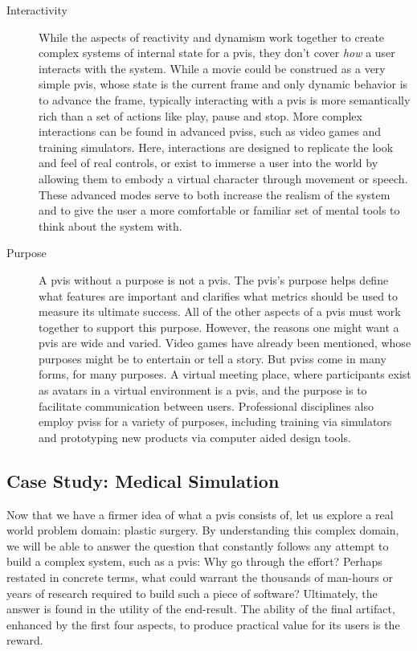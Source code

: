 \begin{description}
\item[Interactivity] While the aspects of reactivity and dynamism work
  together to create complex systems of internal state for a
  \gls{pvis}, they don't cover \textit{how} a user interacts with the
  system. While a movie could be construed as a very simple
  \gls{pvis}, whose state is the current frame and only dynamic
  behavior is to advance the frame, typically interacting with a
  \gls{pvis} is more semantically rich than a set of actions like
  play, pause and stop. More complex interactions can be found in
  advanced \glspl{pvis}, such as video games and training
  simulators. Here, interactions are designed to replicate the look
  and feel of real controls, or exist to immerse a user into the world
  by allowing them to embody a virtual character through movement or
  speech. These advanced modes serve to both increase the realism of
  the system and to give the user a more comfortable or familiar set
  of mental tools to think about the system with.

\item[Purpose] A \gls{pvis} without a purpose is not a \gls{pvis}. The
  \gls{pvis}'s purpose helps define what features are important and
  clarifies what metrics should be used to measure its ultimate
  success. All of the other aspects of a \gls{pvis} must work together
  to support this purpose.  However, the reasons one might want a
  \gls{pvis} are wide and varied. Video games have already been
  mentioned, whose purposes might be to entertain or tell a story. But
  \glspl{pvis} come in many forms, for many purposes. A virtual
  meeting place, where participants exist as avatars in a virtual
  environment is a \gls{pvis}, and the purpose is to facilitate
  communication between users. Professional disciplines also employ
  \glspl{pvis} for a variety of purposes, including training via
  simulators and prototyping new products via computer aided design
  tools.
      
\end{description}

\subsection{Case Study: Medical Simulation}

Now that we have a firmer idea of what a \acrlong{pvis} consists of,
let us explore a real world problem domain: plastic surgery. By
understanding this complex domain, we will be able to answer the
question that constantly follows any attempt to build a complex
system, such as a \gls{pvis}: Why go through the effort?  Perhaps
restated in concrete terms, what could warrant the thousands of
man-hours or years of research required to build such a piece of
software? Ultimately, the answer is found in the utility of the
end-result. The ability of the final artifact, enhanced by the first
four aspects, to produce practical value for its users is the reward.

